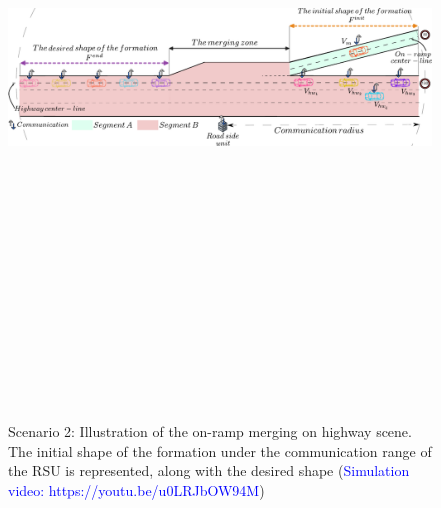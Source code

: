    \begin{figure}[!h]
        \centering 
        \includegraphics[width=13cm,height=18cm,keepaspectratio]{chapters/Chapitre_6/Figures/Scenario_2/Scenario2_ScenarioScene.pdf}
        \caption{Scenario 2: Illustration of the on-ramp merging on highway scene. The initial shape of the formation under the communication range of the RSU is represented, along with the desired shape (\textcolor{blue}{Simulation video: https://youtu.be/u0LRJbOW94M})}
        \label{fig:scenario02:scenario_scene}
        \end{figure}














